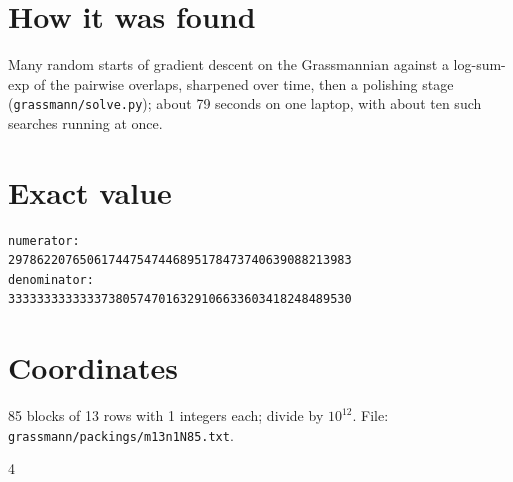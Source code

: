 \documentclass[11pt,a4paper]{article}
\begin{document}
\section{How it was found}
Many random starts of gradient descent on the Grassmannian against a log-sum-exp of the pairwise overlaps, sharpened over time, then a polishing stage (\texttt{grassmann/solve.py}); about 79 seconds on one laptop, with about ten such searches running at once.


\appendix
\section{Exact value}
{\small
\begin{verbatim}
numerator:
297862207650617447547446895178473740639088213983
denominator:
333333333333373805747016329106633603418248489530
\end{verbatim}}

\section{Coordinates}
85 blocks of 13 rows with 1 integers each; divide by $10^{12}$. File: \texttt{grassmann/packings/m13n1N85.txt}.
{\tiny
\begin{multicols}{4}
\end{multicols}}
\end{document}
